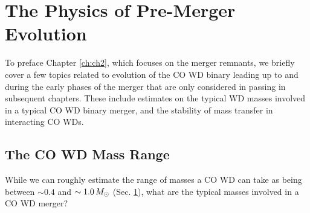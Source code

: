 \section{The Physics of Pre-Merger Evolution}

To preface Chapter \ref{ch:ch2}, which focuses on the merger remnants, we briefly cover a few topics related to evolution of the CO WD binary leading up to and during the early phases of the merger that are only considered in passing in subsequent chapters.  These include estimates on the typical WD masses involved in a typical CO WD binary merger, and the stability of mass transfer in interacting CO WDs.

\subsection{The CO WD Mass Range}
\label{ssec:c1_cowd_massrange}

While we can roughly estimate the range of masses a CO WD can take as being between $\sim0.4$ and $\sim1.0\,\Msun$ (Sec. \ref{}), what are the typical masses involved in a CO WD merger?


